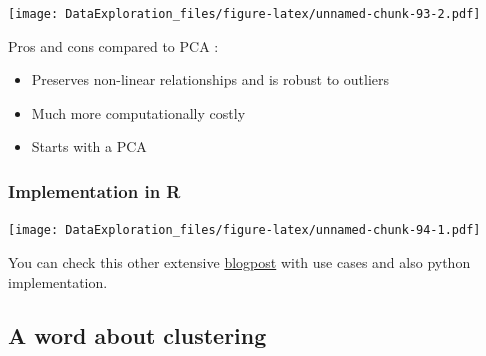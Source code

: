 \documentclass[
]{book}
\newenvironment{Shaded}{\begin{snugshade}}{\end{snugshade}}
\newcommand{\CommentTok}[1]{\textcolor[rgb]{0.56,0.35,0.01}{\textit{#1}}}
\newcommand{\DataTypeTok}[1]{\textcolor[rgb]{0.13,0.29,0.53}{#1}}
\newcommand{\DecValTok}[1]{\textcolor[rgb]{0.00,0.00,0.81}{#1}}
\newcommand{\KeywordTok}[1]{\textcolor[rgb]{0.13,0.29,0.53}{\textbf{#1}}}
\newcommand{\NormalTok}[1]{#1}
\newcommand{\OperatorTok}[1]{\textcolor[rgb]{0.81,0.36,0.00}{\textbf{#1}}}
\newcommand{\StringTok}[1]{\textcolor[rgb]{0.31,0.60,0.02}{#1}}
\providecommand{\tightlist}{%
  \setlength{\itemsep}{0pt}\setlength{\parskip}{0pt}}
\begin{document}
\texttt{[image: DataExploration\_files/figure-latex/unnamed-chunk-93-2.pdf]}

Pros and cons compared to PCA :

\begin{itemize}
\tightlist
\item
  Preserves non-linear relationships and is robust to outliers
\item
  Much more computationally costly
\item
  Starts with a PCA
\end{itemize}

\hypertarget{implementation-in-r}{%
\subsubsection{Implementation in R}\label{implementation-in-r}}

\begin{Shaded}
\end{Shaded}

\texttt{[image: DataExploration\_files/figure-latex/unnamed-chunk-94-1.pdf]}

You can check this other extensive \href{https://www.analyticsvidhya.com/blog/2017/01/t-sne-implementation-r-python/}{blogpost} with use cases and also python implementation.

\hypertarget{a-word-about-clustering}{%
\subsection{A word about clustering}\label{a-word-about-clustering}}
\end{document}
